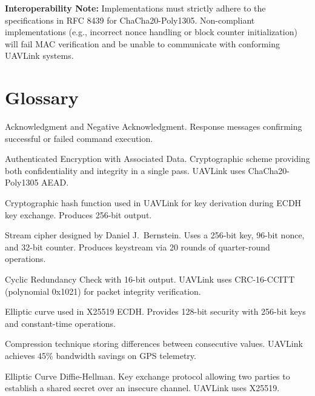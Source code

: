 \documentclass[11pt,a4paper]{article}
\begin{document}
\begin{notebox}
\textbf{Interoperability Note:} Implementations must strictly adhere to the specifications in RFC 8439 for ChaCha20-Poly1305. Non-compliant implementations (e.g., incorrect nonce handling or block counter initialization) will fail MAC verification and be unable to communicate with conforming UAVLink systems.
\end{notebox}

\section{Glossary}

\begin{description}[style=nextline]
    \item[ACK/NACK] Acknowledgment and Negative Acknowledgment. Response messages confirming successful or failed command execution.
    
    \item[AEAD] Authenticated Encryption with Associated Data. Cryptographic scheme providing both confidentiality and integrity in a single pass. UAVLink uses ChaCha20-Poly1305 AEAD.
    
    \item[BLAKE2b] Cryptographic hash function used in UAVLink for key derivation during ECDH key exchange. Produces 256-bit output.
    
    \item[ChaCha20] Stream cipher designed by Daniel J.\ Bernstein. Uses a 256-bit key, 96-bit nonce, and 32-bit counter. Produces keystream via 20 rounds of quarter-round operations.
    
    \item[CRC-16] Cyclic Redundancy Check with 16-bit output. UAVLink uses CRC-16-CCITT (polynomial 0x1021) for packet integrity verification.
    
    \item[Curve25519] Elliptic curve used in X25519 ECDH. Provides 128-bit security with 256-bit keys and constant-time operations.
    
    \item[Delta Encoding] Compression technique storing differences between consecutive values. UAVLink achieves 45\% bandwidth savings on GPS telemetry.
    
    \item[ECDH] Elliptic Curve Diffie-Hellman. Key exchange protocol allowing two parties to establish a shared secret over an insecure channel. UAVLink uses X25519.
    

\end{description}
\end{document}
